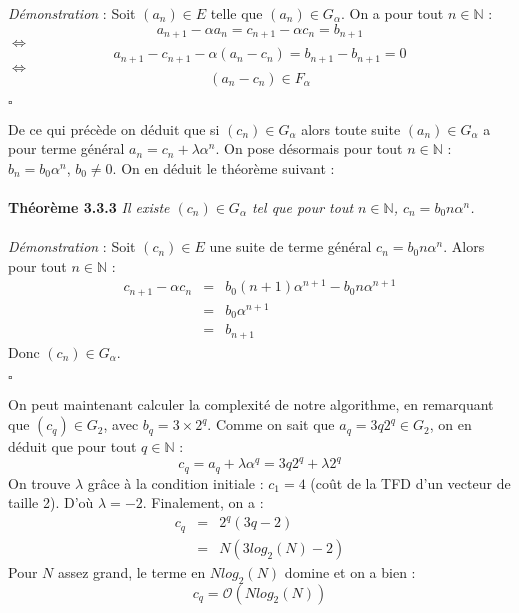 \documentclass[12pt]{article}
\begin{document}
\textit{Démonstration} : Soit $(a_n)\in E$ telle que $(a_n)\in G_\alpha$.
On a pour tout $n\in\mathbb{N}$ :\\ \begin{equation*}
a_{n+1}-\alpha a_n=c_{n+1}-\alpha c_n=b_{n+1}
\end{equation*}
$\Leftrightarrow$
\begin{equation*}
a_{n+1}-c_{n+1}-\alpha(a_n-c_n)=b_{n+1}-b_{n+1}=0
\end{equation*}
$\Leftrightarrow$
\begin{equation*}
(a_n-c_n)\in F_\alpha
\end{equation*}
\begin{flushright} $\square$ \end{flushright}
De ce qui précède on déduit que si $(c_n)\in G_\alpha$ alors toute suite $(a_n)\in G_\alpha$ a pour terme général $a_n=c_n+\lambda\alpha^n$.
On pose désormais pour tout $n\in\mathbb{N}$ : $b_n=b_0\alpha^n$, $b_0\neq 0$. On en déduit le théorème suivant :\\\\
\textbf{Théorème 3.3.3} \textit{Il existe $(c_n)\in G_\alpha$ tel que pour tout $n\in\mathbb{N}$, $c_n=b_0n\alpha^n$.}\\\\
\textit{Démonstration} : Soit $(c_n)\in E$ une suite de terme général $c_n=b_0n\alpha^n$. Alors pour tout $n\in\mathbb{N}$ :\begin{eqnarray*}
c_{n+1}-\alpha c_n&=&b_0(n+1)\alpha^{n+1}-b_0n\alpha^{n+1}\\
&=&b_0\alpha^{n+1}\\
&=&b_{n+1}
\end{eqnarray*}
Donc $(c_n)\in G_\alpha$.
\begin{flushright} $\square$ \end{flushright}
On peut maintenant calculer la complexité de notre algorithme, en remarquant que $(c_q)\in G_2$, avec $b_q=3\times2^q$. Comme on sait que $a_q=3q2^q\in G_2$, on en déduit que pour tout $q\in\mathbb{N}$ : \begin{equation*}
c_q=a_q+\lambda\alpha^q=3q2^q+\lambda 2^q
\end{equation*}
On trouve $\lambda$ grâce à la condition initiale : $c_1=4$ (coût de la TFD d'un vecteur de taille 2). D'où $\lambda=-2$. Finalement, on a : \begin{eqnarray}
c_q&=&2^q(3q-2)\nonumber\\
&=&N(3log_2(N)-2)
\end{eqnarray}
Pour $N$ assez grand, le terme en $Nlog_2(N)$ domine et on a bien :\\ \begin{equation}
c_q=\mathcal{O}(Nlog_2(N))
\end{equation}
\end{document}
